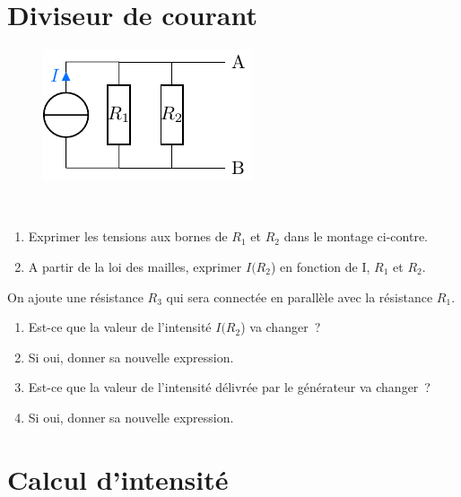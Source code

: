 \documentclass[../../main/main.tex]{subfiles}
\begin{document}
\section{Diviseur de courant}

\begin{figure}
	\vspace{60pt}
	\centering
	\includegraphics[width=\linewidth]{divcour_plain}
\end{figure}
~
\begin{enumerate}
	\item Exprimer les tensions aux bornes de $R_1$ et $R_2$ dans le montage
	      ci-contre.
	\item A partir de la loi des mailles, exprimer $I(R_2$) en fonction de I,
	      $R_1$ et $R_2$.
\end{enumerate}
On ajoute une résistance $R_3$ qui sera connectée en parallèle avec la
résistance $R_1$.
\begin{enumerate}[resume]
	\item Est-ce que la valeur de l'intensité $I(R_2$) va changer~?
	\item Si oui, donner sa nouvelle expression.
	\item Est-ce que la valeur de l'intensité délivrée par le générateur va
	      changer~?
	\item Si oui, donner sa nouvelle expression.
\end{enumerate}

\section{Calcul d'intensité}
\end{document}
